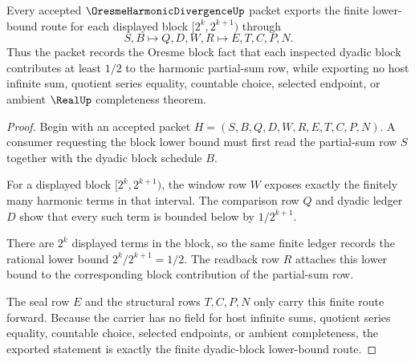 \begin{theorem}
\label{thm:oresme-harmonic-divergence-dyadic-block-lower-bound}
Every accepted $\OresmeHarmonicDivergenceUp$ packet exports the finite lower-bound route for each displayed block $[2^k,2^{k+1})$ through
$$
S,B\longmapsto Q,D,W,R\longmapsto E,T,C,P,N .
$$
Thus the packet records the Oresme block fact that each inspected dyadic block contributes at least $1/2$ to the harmonic partial-sum row, while exporting no host infinite sum, quotient series equality, countable choice, selected endpoint, or ambient $\RealUp$ completeness theorem.
\end{theorem}
\begin{proof}
Begin with an accepted packet $H=(S,B,Q,D,W,R,E,T,C,P,N)$. A consumer requesting the block lower bound must first read the partial-sum row $S$ together with the dyadic block schedule $B$.

For a displayed block $[2^k,2^{k+1})$, the window row $W$ exposes exactly the finitely many harmonic terms in that interval. The comparison row $Q$ and dyadic ledger $D$ show that every such term is bounded below by $1/2^{k+1}$.

There are $2^k$ displayed terms in the block, so the same finite ledger records the rational lower bound $2^k/2^{k+1}=1/2$. The readback row $R$ attaches this lower bound to the corresponding block contribution of the partial-sum row.

The seal row $E$ and the structural rows $T,C,P,N$ only carry this finite route forward. Because the carrier has no field for host infinite sums, quotient series equality, countable choice, selected endpoints, or ambient completeness, the exported statement is exactly the finite dyadic-block lower-bound route.
\end{proof}



